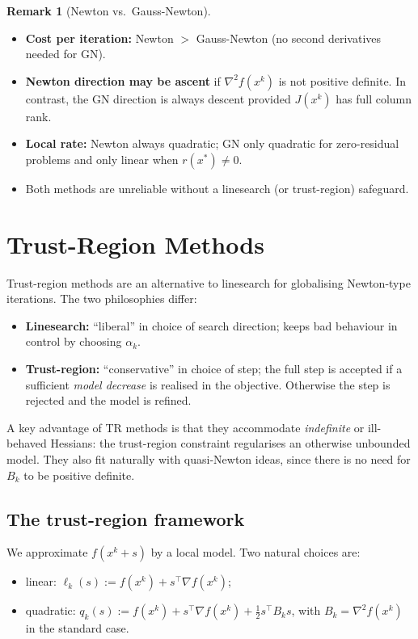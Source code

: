 \documentclass[11pt,a4paper]{report}
\theoremstyle{plain}
\theoremstyle{definition}
\newtheorem{remark}[theorem]{Remark}
\newcommand{\grad}{\nabla}
\newcommand{\hess}{\nabla^{2}}
\newcommand{\trans}{^{\top}}
\begin{document}
\begin{remark}[Newton vs.\ Gauss-Newton]\
\begin{itemize}[leftmargin=2em,itemsep=0pt]
  \item \textbf{Cost per iteration:} Newton $>$ Gauss-Newton (no second
        derivatives needed for GN).
  \item \textbf{Newton direction may be ascent} if $\hess f(x^{k})$ is not positive
        definite. In contrast, the GN direction is always descent provided
        $J(x^{k})$ has full column rank.
  \item \textbf{Local rate:} Newton always quadratic; GN only quadratic for
        zero-residual problems and only linear when $r(x^{*})\ne 0$.
  \item Both methods are unreliable without a linesearch (or trust-region)
        safeguard.
\end{itemize}
\end{remark}


\chapter{Trust-Region Methods}

Trust-region methods are an alternative to linesearch for globalising Newton-type
iterations. The two philosophies differ:
\begin{itemize}[leftmargin=2em,itemsep=0pt]
  \item \textbf{Linesearch:} ``liberal'' in choice of search direction; keeps bad
        behaviour in control by choosing $\alpha_{k}$.
  \item \textbf{Trust-region:} ``conservative'' in choice of step; the full step
        is accepted if a sufficient \emph{model decrease} is realised in the
        objective. Otherwise the step is rejected and the model is refined.
\end{itemize}
A key advantage of TR methods is that they accommodate \emph{indefinite} or
ill-behaved Hessians: the trust-region constraint regularises an otherwise
unbounded model. They also fit naturally with quasi-Newton ideas, since there is
no need for $B_{k}$ to be positive definite.

\section{The trust-region framework}

We approximate $f(x^{k}+s)$ by a local model. Two natural choices are:
\begin{itemize}[leftmargin=2em,itemsep=0pt]
  \item linear: $\ell_{k}(s):=f(x^{k})+s\trans\grad f(x^{k})$;
  \item quadratic: $q_{k}(s):=f(x^{k})+s\trans\grad f(x^{k})+\tfrac12 s\trans
        B_{k} s$, with $B_{k}=\hess f(x^{k})$ in the standard case.
\end{itemize}
\end{document}
